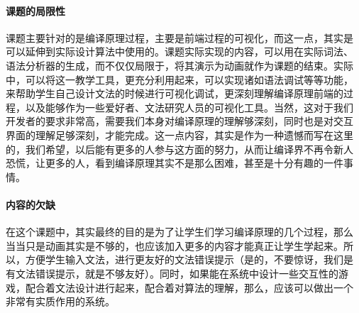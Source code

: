 \documentclass{article}
\begin{document}
\paragraph{课题的局限性}
课题主要针对的是编译原理过程，主要是前端过程的可视化，而这一点，其实是
可以延伸到实际设计算法中使用的。课题实际实现的内容，可以用在实际词法、
语法分析器的生成，而不仅仅局限于，将其演示为动画就作为课题的结束。实际
中，可以将这一教学工具，更充分利用起来，可以实现诸如语法调试等等功能，
来帮助学生自己设计文法的时候进行可视化调试，更深刻理解编译原理前端的过
程，以及能够作为一些爱好者、文法研究人员的可视化工具。当然，这对于我们
开发者的要求非常高，需要我们本身对编译原理的理解够深刻，同时也是对交互
界面的理解足够深刻，才能完成。这一点内容，其实是作为一种遗憾而写在这里
的，我们希望，以后能有更多的人参与这方面的努力，从而让编译界不再令新人
恐慌，让更多的人，看到编译原理其实不是那么困难，甚至是十分有趣的一件事
情。
\paragraph{内容的欠缺}
在这个课题中，其实最终的目的是为了让学生们学习编译原理的几个过程，那么
当当只是动画其实是不够的，也应该加入更多的内容才能真正让学生学起来。所
以，方便学生输入文法，进行更友好的文法错误提示（是的，不要惊讶，我们是
有文法错误提示，就是不够友好）。同时，如果能在系统中设计一些交互性的游
戏，配合着文法设计进行起来，配合着对算法的理解，那么，应该可以做出一个
非常有实质作用的系统。
\end{document}
